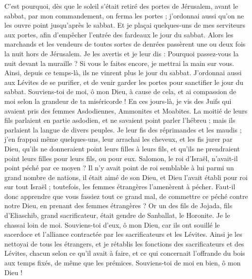 \begin{multicols}{2}
C'est pourquoi, dès que le soleil s'était retiré des portes de Jérusalem, avant le sabbat, par mon commandement, on ferma les portes ; j’ordonnai aussi qu'on ne les ouvre point jusqu'après le sabbat. Et je plaçai quelques-uns de mes serviteurs aux portes, afin d’empêcher l'entrée des fardeaux le jour du sabbat.
Alors les marchands et les vendeurs de toutes sortes de denrées passèrent une ou deux fois la nuit hors de Jérusalem.
Je les avertis et je leur dis : Pourquoi passez-vous la nuit devant la muraille ? Si vous le faites encore, je mettrai la main sur vous. Ainsi, depuis ce temps-là, ils ne vinrent plus le jour du sabbat.
J’ordonnai aussi aux Lévites de se purifier, et de venir garder les portes pour sanctifier le jour du sabbat. Souviens-toi de moi, ô mon Dieu, à cause de cela, et ai compassion de moi selon la grandeur de ta miséricorde !
En ces jours-là, je vis des Juifs qui avaient pris des femmes Asdodiennes, Ammonites et Moabites.
La moitié de leurs fils parlaient en partie asdodien, et ne savaient point parler l’hébreu ; mais ils parlaient la langue de divers peuples.
Je leur fis des réprimandes et les maudis ; j'en frappai même quelques-uns, leur arrachai les cheveux, et les fis jurer par Dieu, qu'ils ne donneraient point leurs filles à leurs fils, et qu'ils ne prendraient point leurs filles pour leurs fils, ou pour eux.
Salomon, le roi d'Israël, n'avait-il point péché par ce moyen ? Il n'y avait point de roi semblable à lui parmi un grand nombre de nations, il était aimé de son Dieu, et Dieu l'avait établi pour roi sur tout Israël ; toutefois, les femmes étrangères l’amenèrent à pécher.
Faut-il donc apprendre que vous fassiez tout ce grand mal, de commettre ce péché contre notre Dieu, en prenant des femmes étrangères ?
Or un des fils de Jojada, fils d'Eliaschib, grand sacrificateur, était gendre de Sanballat, le Horonite. Je le chassai loin de moi.
Souviens-toi d’eux, ô mon Dieu, car ils ont souillé le sacerdoce et l'alliance contractée par les sacrificateurs et les Lévites.
Ainsi je les nettoyai de tous les étrangers, et je rétablis les fonctions des sacrificateurs et des Lévites, chacun selon ce qu'il avait à faire,
et ce qui concernait l'offrande du bois aux temps fixés, de même que les prémices. Souviens-toi de moi en bien, ô mon Dieu !
\PPE{}
\end{multicols}
